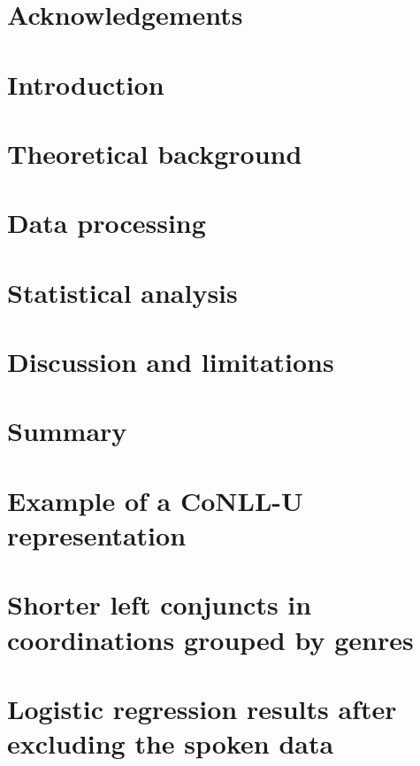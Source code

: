 \documentclass[12pt]{report}
\begin{document}
\chapter*{Acknowledgements}
    

\pagestyle{fancy}
\chapter{Introduction}\label{ch:introduction}
    
\chapter{Theoretical background}\label{ch:theory}
    
\chapter{Data processing}\label{ch:technical}
    
\chapter{Statistical analysis}\label{ch:stats}
    
\chapter{Discussion and limitations}\label{ch:discussion}
    
\chapter{Summary}
    

\appendix
\captionsetup{labelfont=bf}
\chapter{Example of a CoNLL-U representation}\label{ap:conllu}
    
\chapter{Shorter left conjuncts in coordinations grouped by genres}\label{ap:genres}
    
\chapter{Logistic regression results after excluding the spoken data}
    \label{ap:written}


\end{document}
